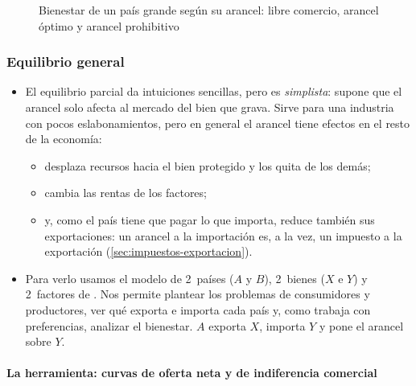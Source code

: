 \documentclass[11pt]{article}
\begin{document}
\begin{figure}[H]
\centering
\caption{Bienestar de un país grande según su arancel: libre comercio, arancel óptimo y arancel prohibitivo}\label{fig:bienestar-arancel}
\end{figure}

\subsubsection{Equilibrio general}\label{sec:general}

\begin{itemize}
\item El equilibrio parcial da intuiciones sencillas, pero es \emph{simplista}: supone que el arancel solo afecta al mercado del bien que grava. Sirve para una industria con pocos eslabonamientos, pero en general el arancel tiene efectos en el resto de la economía:
  \begin{itemize}
  \item desplaza recursos hacia el bien protegido y los quita de los demás;
  \item cambia las rentas de los factores;
  \item y, como el país tiene que pagar lo que importa, reduce también sus exportaciones: un arancel a la importación es, a la vez, un impuesto a la exportación (\ref{sec:impuestos-exportacion}).
  \end{itemize}
\item Para verlo usamos el modelo de 2~países ($A$ y $B$), 2~bienes ($X$ e $Y$) y 2~factores de \textcite{Haberler1936Theory} . Nos permite plantear los problemas de consumidores y productores, ver qué exporta e importa cada país y, como trabaja con preferencias, analizar el bienestar. $A$ exporta $X$, importa $Y$ y pone el arancel sobre $Y$.
\end{itemize}

\paragraph{La herramienta: curvas de oferta neta y de indiferencia comercial}
\end{document}
